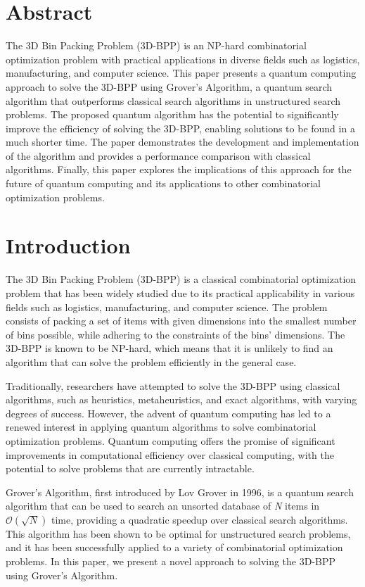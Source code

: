 \section{Abstract}
The 3D Bin Packing Problem (3D-BPP) is an NP-hard combinatorial optimization problem with practical applications in diverse fields such as logistics, manufacturing, and computer science. This paper presents a quantum computing approach to solve the 3D-BPP using Grover's Algorithm, a quantum search algorithm that outperforms classical search algorithms in unstructured search problems. The proposed quantum algorithm has the potential to significantly improve the efficiency of solving the 3D-BPP, enabling solutions to be found in a much shorter time. The paper demonstrates the development and implementation of the algorithm and provides a performance comparison with classical algorithms. Finally, this paper explores the implications of this approach for the future of quantum computing and its applications to other combinatorial optimization problems.

\section{Introduction}
The 3D Bin Packing Problem (3D-BPP) is a classical combinatorial optimization problem that has been widely studied due to its practical applicability in various fields such as logistics, manufacturing, and computer science. The problem consists of packing a set of items with given dimensions into the smallest number of bins possible, while adhering to the constraints of the bins' dimensions. The 3D-BPP is known to be NP-hard, which means that it is unlikely to find an algorithm that can solve the problem efficiently in the general case.

Traditionally, researchers have attempted to solve the 3D-BPP using classical algorithms, such as heuristics, metaheuristics, and exact algorithms, with varying degrees of success. However, the advent of quantum computing has led to a renewed interest in applying quantum algorithms to solve combinatorial optimization problems. Quantum computing offers the promise of significant improvements in computational efficiency over classical computing, with the potential to solve problems that are currently intractable.

Grover's Algorithm, first introduced by Lov Grover in 1996, is a quantum search algorithm that can be used to search an unsorted database of \emph{N} items in $\mathcal{O}(\sqrt{N})$ time, providing a quadratic speedup over classical search algorithms. This algorithm has been shown to be optimal for unstructured search problems, and it has been successfully applied to a variety of combinatorial optimization problems. In this paper, we present a novel approach to solving the 3D-BPP using Grover's Algorithm.

